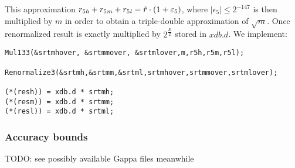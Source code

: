 This approximation $r_{5\mathit{h}} + r_{5\mathit{m}} + r_{5\mathit{l}} = \hat{r} \cdot
\left( 1 + \varepsilon_5 \right)$, where $\left \vert \epsilon_5 \right
\vert \leq 2^{-147}$ is then multiplied by $m$ in order to obtain a
triple-double approximation of $\sqrt{m}$. Once renormalized result is
exactly multiplied by $2^{\frac{E}{2}}$ stored in $xdb.d$.  We
implement:
\begin{lstlisting}[caption={Newton iteration - triple-double step},firstnumber=1]
Mul133(&srtmhover, &srtmmover, &srtmlover,m,r5h,r5m,r5l);                     
                                                                                     
Renormalize3(&srtmh,&srtmm,&srtml,srtmhover,srtmmover,srtmlover);

(*(resh)) = xdb.d * srtmh;
(*(resm)) = xdb.d * srtmm;                                                         
(*(resl)) = xdb.d * srtml;                                                         
\end{lstlisting}

\subsubsection{Accuracy bounds}

TODO: see possibly available Gappa files meanwhile


